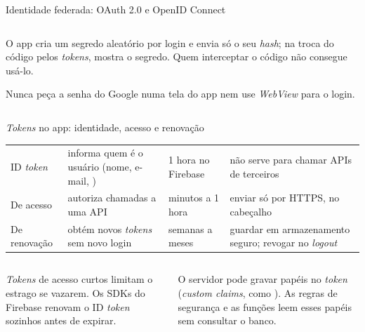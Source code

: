 \begin{frame}{Identidade federada: OAuth 2.0 e OpenID Connect}
\begin{columns}[c]
\begin{column}{0.48\textwidth}
\begin{definicao}
      \end{definicao}
      \begin{pordentro}[PKCE]
        O app cria um segredo aleatório por login e envia só o seu \emph{hash}; na troca do código pelos \emph{tokens}, mostra o segredo. Quem interceptar o código não consegue usá-lo.
      \end{pordentro}
      \begin{atencao}
        Nunca peça a senha do Google numa tela do app nem use \emph{WebView} para o login.
      \end{atencao}
    \end{column}
  \end{columns}
\end{frame}

\begin{frame}{\emph{Tokens} no app: identidade, acesso e renovação}
  \scriptsize
  \begin{tabularx}{\textwidth}{@{}l L l L@{}}
    \toprule
     &  &  &  \\
    \midrule
    ID \emph{token} & informa quem é o usuário (nome, e-mail, ) & 1 hora no Firebase & não serve para chamar APIs de terceiros \\
    De acesso & autoriza chamadas a uma API & minutos a 1 hora & enviar só por HTTPS, no cabeçalho  \\
    De renovação & obtém novos \emph{tokens} sem novo login & semanas a meses & guardar em armazenamento seguro; revogar no \emph{logout} \\
    \bottomrule
  \end{tabularx}
  \normalsize
  \vspace{4pt}
  \begin{columns}[T]
    \begin{column}{0.49\textwidth}
      \begin{conceito}
        \emph{Tokens} de acesso curtos limitam o estrago se vazarem. Os SDKs do Firebase renovam o ID \emph{token} sozinhos antes de expirar.
      \end{conceito}
    \end{column}
    \begin{column}{0.49\textwidth}
      \begin{pordentro}
        O servidor pode gravar papéis no \emph{token} (\emph{custom claims}, como ). As regras de segurança e as funções leem esses papéis sem consultar o banco.
      \end{pordentro}
    \end{column}
  \end{columns}
\end{frame}

